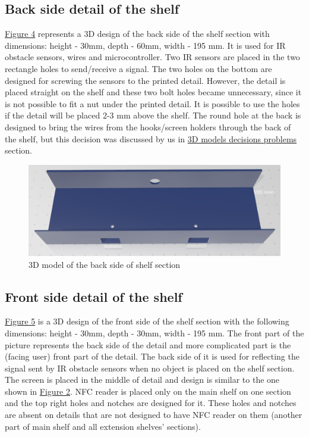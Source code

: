\documentclass{article}
\begin{document}
\subsection{Back side detail of the shelf}
\hyperref[fig:shelf-back]{Figure 4} represents a 3D design of the back side of the shelf section with dimensions: height - 30mm, depth - 60mm, width - 195 mm. It is used for IR obstacle sensors, wires and microcontroller. Two IR sensors are placed in the two rectangle holes to send/receive a signal. The two holes on the bottom are designed for screwing the sensors to the printed detail. However, the detail is placed straight on the shelf and these two bolt holes became unnecessary, since it is not possible to fit a nut under the printed detail. It is possible to use the holes if the detail will be placed 2-3 mm above the shelf. The round hole at the back is designed to bring the wires from the hooks/screen holders through the back of the shelf, but this decision was discussed by us in \hyperref[sec:3dproblems]{3D models decisions problems} section.
\begin{figure}[H]
    \begin{center}
        \includegraphics[width=\textwidth]{3d/shelf-back.png}
    \end{center}
    \caption{3D model of the back side of shelf section}
    \label{fig:shelf-back}
\end{figure}

\subsection{Front side detail of the shelf}
\hyperref[fig:shelf-front]{Figure 5} is a 3D design of the front side of the shelf section with the following dimensions: height - 30mm, depth - 30mm, width - 195 mm. The front part of the picture represents the back side of the detail and more complicated part is the (facing user) front part of the detail. The back side of it is used for reflecting the signal sent by IR obstacle sensors when no object is placed on the shelf section. The screen is placed in the middle of detail and design is similar to the one shown in \hyperref[fig:screen]{Figure 2}. NFC reader is placed only on the main shelf on one section and the top right holes and notches are designed for it. These holes and notches are absent on details that are not designed to have NFC reader on them (another part of main shelf and all extension shelves' sections). 
\end{document}
